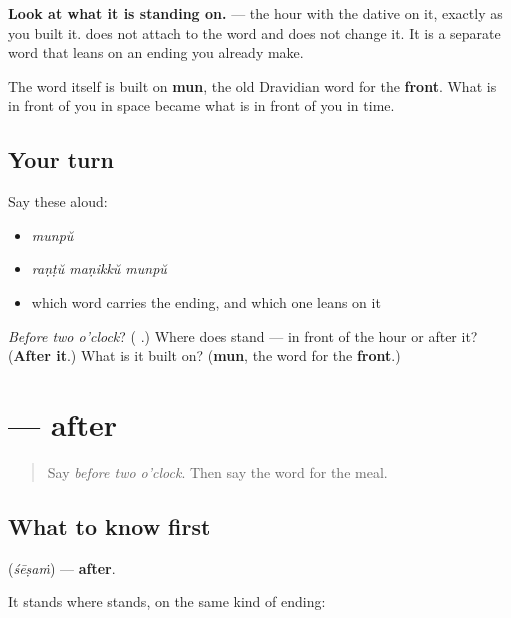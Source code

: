 \begin{culture}
\textbf{Look at what it is standing on.} \textbf{} — the hour with the dative on it, exactly as you built it. \textbf{} does not attach to the word and does not change it. It is a separate word that leans on an ending you already make.

The word itself is built on \textbf{mun}, the old Dravidian word for the \textbf{front}. What is in front of you in space became what is in front of you in time.
\end{culture}

\subsection*{Your turn}
Say these aloud:

\begin{itemize}
\raggedright
  \item \emph{munpŭ}
  \item \emph{raṇṭŭ maṇikkŭ munpŭ}
  \item which word carries the ending, and which one leans on it
\end{itemize}

\begin{tcolorbox}[breakable,colback=teal!4,colframe=teal!35!black,title={Before you move on}]
\emph{Before two o'clock}? (\textbf{  }.) Where does \textbf{} stand — in front of the hour or after it? (\textbf{After it}.) What is it built on? (\textbf{mun}, the word for the \textbf{front}.)
\end{tcolorbox}
\section[\texorpdfstring{\ml{ശേഷം} (śēṣaṁ)}{ശേഷം (śēṣaṁ)}]{ — after}

\label{lesson:ML-C106-shesham}



\begin{quote}
Say \emph{before two o'clock}. Then say the word for the meal.
\end{quote}

\subsection*{What to know first}
\textbf{} (\emph{śēṣaṁ}) — \textbf{after}.

It stands where \textbf{} stands, on the same kind of ending:

